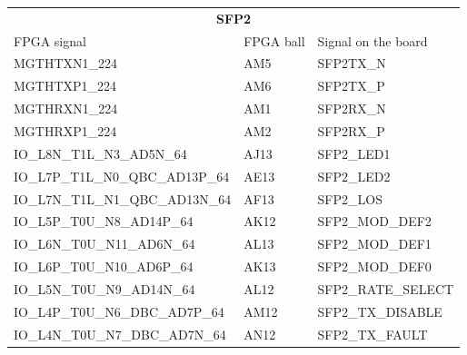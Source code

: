 \begin{footnotesize}
	\begin{longtable}{|p{7cm}|p{1cm}|p{5cm}|}
		\hline
		\multicolumn{3}{|c|}{\multirow{2}{*}{\textbf{\large{SFP2}}}}\\
		\multicolumn{3}{|c|}{} \\ \hline 
FPGA signal	&	FPGA ball	&	Signal on the board	\\ \hline
MGTHTXN1\_224	&	AM5	&	SFP2TX\_N	\\ \hline
MGTHTXP1\_224	&	AM6	&	SFP2TX\_P	\\ \hline
MGTHRXN1\_224	&	AM1	&	SFP2RX\_N	\\ \hline
MGTHRXP1\_224	&	AM2	&	SFP2RX\_P	\\ \hline
IO\_L8N\_T1L\_N3\_AD5N\_64	&	AJ13	&	SFP2\_LED1	\\ \hline
IO\_L7P\_T1L\_N0\_QBC\_AD13P\_64	&	AE13	&	SFP2\_LED2	\\ \hline
IO\_L7N\_T1L\_N1\_QBC\_AD13N\_64	&	AF13	&	SFP2\_LOS	\\ \hline
IO\_L5P\_T0U\_N8\_AD14P\_64	&	AK12	&	SFP2\_MOD\_DEF2	\\ \hline
IO\_L6N\_T0U\_N11\_AD6N\_64	&	AL13	&	SFP2\_MOD\_DEF1	\\ \hline
IO\_L6P\_T0U\_N10\_AD6P\_64	&	AK13	&	SFP2\_MOD\_DEF0	\\ \hline
IO\_L5N\_T0U\_N9\_AD14N\_64	&	AL12	&	SFP2\_RATE\_SELECT	\\ \hline
IO\_L4P\_T0U\_N6\_DBC\_AD7P\_64	&	AM12	&	SFP2\_TX\_DISABLE	\\ \hline
IO\_L4N\_T0U\_N7\_DBC\_AD7N\_64	&	AN12	&	SFP2\_TX\_FAULT	\\ \hline


		
	\end{longtable}
\end{footnotesize}

